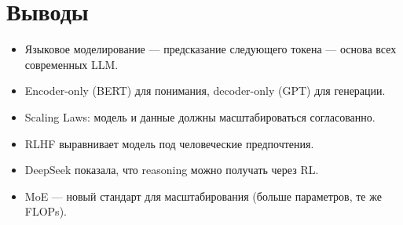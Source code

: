 \documentclass[a4paper,12pt]{article}
\begin{document}
\section{Выводы}
\begin{itemize}
    \item Языковое моделирование --- предсказание следующего токена --- основа всех современных LLM.
    \item Encoder-only (BERT) для понимания, decoder-only (GPT) для генерации.
    \item Scaling Laws: модель и данные должны масштабироваться согласованно.
    \item RLHF выравнивает модель под человеческие предпочтения.
    \item DeepSeek показала, что reasoning можно получать через RL.
    \item MoE --- новый стандарт для масштабирования (больше параметров, те же FLOPs).
\end{itemize}
\end{document}
